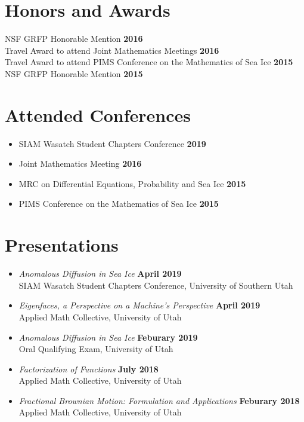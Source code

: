 \documentclass[margin,line]{res}
\begin{document}
\begin{resume}
\section{\sc Honors and Awards}
{NSF GRFP Honorable Mention} \hfill {\bf 2016}\\
{Travel Award to attend Joint Mathematics Meetings} \hfill {\bf 2016}\\
{Travel Award to attend PIMS Conference on the Mathematics of Sea Ice} \hfill {\bf 2015}\\
{NSF GRFP Honorable Mention} \hfill {\bf 2015}\\

\ifx\nopubs\undefined

\else
%
\fi

\section{\sc Attended Conferences}
\begin{itemize}
\item[] SIAM Wasatch Student Chapters Conference
\hfill {\bf 2019}
\item[] Joint Mathematics Meeting
\hfill {\bf 2016}
\item[] MRC on Differential Equations, Probability and Sea Ice
\hfill {\bf 2015}
\item[] PIMS Conference on the Mathematics of Sea Ice
\hfill {\bf 2015}
\end{itemize}

\section{\sc Presentations}
\begin{itemize}
\item[] {\it Anomalous Diffusion in Sea Ice} \hfill {\bf April 2019} 
    \\SIAM Wasatch Student Chapters Conference, University of Southern Utah
\item[] {\it Eigenfaces, a Perspective on a Machine's Perspective} \hfill {\bf April 2019}
    \\Applied Math Collective, University of Utah
\item[] {\it Anomalous Diffusion in Sea Ice} \hfill {\bf Feburary 2019} 
    \\Oral Qualifying Exam, University of Utah
\item[] {\it Factorization of Functions} \hfill {\bf July 2018} 
    \\Applied Math Collective, University of Utah
\item[] {\it Fractional Brownian Motion: Formulation and Applications} \hfill {\bf Feburary 2018} 
    Applied Math Collective, University of Utah
\end{itemize}


\end{resume}
\end{document}
